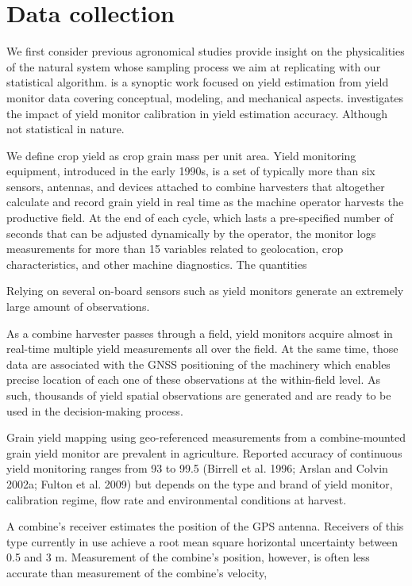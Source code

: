 \chapter{Data collection}

We first consider previous agronomical studies provide insight on the
physicalities of the natural system whose sampling process we aim at
replicating with our statistical algorithm. \cite{Ross2008} is a
synoptic work focused on yield estimation from yield monitor data
covering conceptual, modeling, and mechanical
aspects. \cite{Arslan2002} investigates the impact of yield monitor
calibration in yield estimation accuracy. Although not statistical in
nature.

We define crop yield as crop grain mass per unit area. Yield
monitoring equipment, introduced in the early 1990s, is a set of
typically more than six sensors, antennas, and devices attached to
combine harvesters that altogether calculate and record grain yield in
real time as the machine operator harvests the productive field. At
the end of each cycle, which lasts a pre-specified number of seconds
that can be adjusted dynamically by the operator, the monitor logs
measurements for more than 15 variables related to geolocation, crop
characteristics, and other machine diagnostics. The quantities

Relying on several on-board sensors such as yield monitors generate an
extremely large amount of observations.

As a combine harvester passes through a field, yield monitors acquire
almost in real-time multiple yield measurements all over the field. At
the same time, those data are associated with the GNSS positioning of
the machinery which enables precise location of each one of these
observations at the within-field level. As such, thousands of yield
spatial observations are generated and are ready to be used in the
decision-making process. 

Grain yield mapping using geo-referenced measurements from a
combine-mounted grain yield monitor are prevalent in
agriculture. Reported accuracy of continuous yield monitoring ranges
from 93 to 99.5 (Birrell et al. 1996; Arslan and Colvin 2002a; Fulton
et al. 2009) but depends on the type and brand of yield monitor,
calibration regime, flow rate and environmental conditions at harvest.

A combine's receiver estimates the position of the GPS
antenna. Receivers of this type currently in use achieve a root mean
square horizontal uncertainty between 0.5 and 3 m. Measurement of the
combine's position, however, is often less accurate than measurement
of the combine's velocity,

